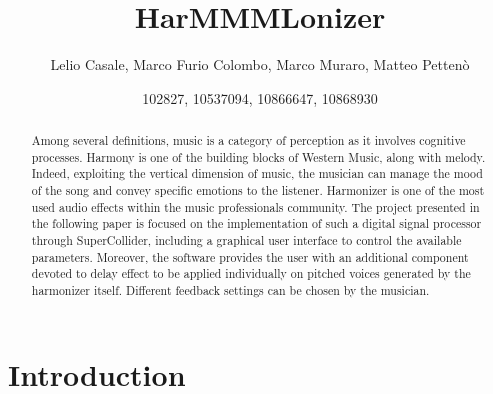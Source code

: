 \documentclass{article}
\title{HarMMMLonizer}
\author{Lelio Casale, Marco Furio Colombo, Marco Muraro, Matteo Pettenò}
\date{102827, 10537094, 10866647, 10868930}
\begin{document}
\maketitle

\begin{abstract}
Among several definitions, music is a category of perception as it involves cognitive processes. Harmony is one of the building blocks of Western Music, along with melody. Indeed, exploiting the vertical dimension of music, the musician can manage the mood of the song and convey specific emotions to the listener.
Harmonizer is one of the most used audio effects within the music professionals community. The project presented in the following paper is focused on the implementation of such a digital signal processor through SuperCollider, including a graphical user interface to control the available parameters. Moreover, the software provides the user with an additional component devoted to delay effect to be applied individually on pitched voices generated by the harmonizer itself. Different feedback settings can be chosen by the musician.

\end{abstract}

\section{Introduction}
\end{document}
